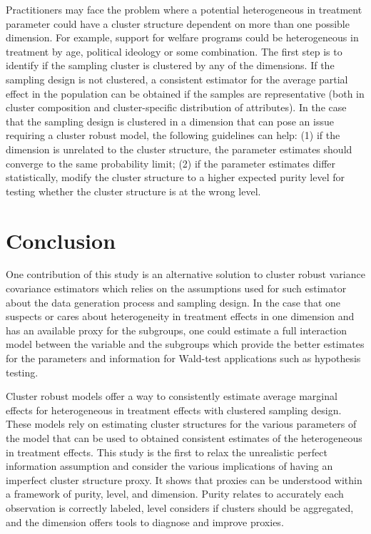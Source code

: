 \documentclass{jbsc}
\begin{document}
Practitioners may face the problem where a potential heterogeneous in treatment parameter could have a cluster structure dependent on more than one possible dimension. For example, support for welfare programs could be heterogeneous in treatment by age, political ideology or some combination. The first step is to identify if the sampling cluster is clustered by any of the dimensions. If the sampling design is not clustered, a consistent estimator for the average partial effect in the population can be obtained if the samples are representative (both in cluster composition and cluster-specific distribution of attributes). In the case that the sampling design is clustered in a dimension that can pose an issue requiring a cluster robust model, the following guidelines can help: (1) if the dimension is unrelated to the cluster structure, the parameter estimates should converge to the same probability limit; (2) if the parameter estimates differ statistically, modify the cluster structure to a higher expected purity level for testing whether the cluster structure is at the wrong level.

\FloatBarrier

\section{Conclusion}

One contribution of this study is an alternative solution to cluster robust variance covariance estimators which relies on the assumptions used for such estimator about the data generation process and sampling design. In the case that one suspects or cares about heterogeneity in treatment effects in one dimension and has an available proxy for the subgroups, one could estimate a full interaction model between the variable and the subgroups which provide the better estimates for the parameters and information for Wald-test applications such as hypothesis testing.

Cluster robust models offer a way to consistently estimate average marginal effects for heterogeneous in treatment effects with clustered sampling design. These models rely on estimating cluster structures for the various parameters of the model that can be used to obtained consistent estimates of the heterogeneous in treatment effects. This study is the first to relax the unrealistic perfect information assumption and consider the various implications of having an imperfect cluster structure proxy. It shows that proxies can be understood within a framework of purity, level, and dimension. Purity relates to accurately each observation is correctly labeled, level considers if clusters should be aggregated, and the dimension offers tools to diagnose and improve proxies.
\end{document}
